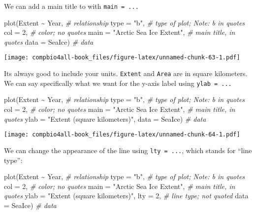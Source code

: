 \documentclass[
]{book}
\newenvironment{Shaded}{\begin{snugshade}}{\end{snugshade}}
\newcommand{\AttributeTok}[1]{\textcolor[rgb]{0.77,0.63,0.00}{#1}}
\newcommand{\CommentTok}[1]{\textcolor[rgb]{0.56,0.35,0.01}{\textit{#1}}}
\newcommand{\DecValTok}[1]{\textcolor[rgb]{0.00,0.00,0.81}{#1}}
\newcommand{\FunctionTok}[1]{\textcolor[rgb]{0.00,0.00,0.00}{#1}}
\newcommand{\NormalTok}[1]{#1}
\newcommand{\SpecialCharTok}[1]{\textcolor[rgb]{0.00,0.00,0.00}{#1}}
\newcommand{\StringTok}[1]{\textcolor[rgb]{0.31,0.60,0.02}{#1}}
\begin{document}
We can add a main title to with \texttt{main\ =\ ...}

\begin{Shaded}
\begin{Highlighting}[]
\FunctionTok{plot}\NormalTok{(Extent }\SpecialCharTok{\textasciitilde{}}\NormalTok{ Year,  }\CommentTok{\# relationship}
     \AttributeTok{type =} \StringTok{"b"}\NormalTok{,     }\CommentTok{\# type of plot; Note: b in quotes}
     \AttributeTok{col =} \DecValTok{2}\NormalTok{,        }\CommentTok{\# color; no quotes}
     \AttributeTok{main =} \StringTok{"Arctic Sea Ice Extent"}\NormalTok{, }\CommentTok{\# main title, in quotes}
     \AttributeTok{data =}\NormalTok{ SeaIce)  }\CommentTok{\# data}
\end{Highlighting}
\end{Shaded}

\texttt{[image: compbio4all-book\_files/figure-latex/unnamed-chunk-63-1.pdf]}

Its always good to include your units. \texttt{Extent} and \texttt{Area} are in square kilometers. We can say specifically what we want for the y-axis label using \texttt{ylab\ =\ ...}

\begin{Shaded}
\begin{Highlighting}[]
\FunctionTok{plot}\NormalTok{(Extent }\SpecialCharTok{\textasciitilde{}}\NormalTok{ Year,  }\CommentTok{\# relationship}
     \AttributeTok{type =} \StringTok{"b"}\NormalTok{,     }\CommentTok{\# type of plot; Note: b in quotes}
     \AttributeTok{col =} \DecValTok{2}\NormalTok{,        }\CommentTok{\# color; no quotes}
     \AttributeTok{main =} \StringTok{"Arctic Sea Ice Extent"}\NormalTok{, }\CommentTok{\# main title, in quotes}
     \AttributeTok{ylab =} \StringTok{"Extent (square kilometers)"}\NormalTok{,}
     \AttributeTok{data =}\NormalTok{ SeaIce)  }\CommentTok{\# data}
\end{Highlighting}
\end{Shaded}

\texttt{[image: compbio4all-book\_files/figure-latex/unnamed-chunk-64-1.pdf]}

We can change the appearance of the line using \texttt{lty\ =\ ...}, which stands for ``line type'':

\begin{Shaded}
\begin{Highlighting}[]
\FunctionTok{plot}\NormalTok{(Extent }\SpecialCharTok{\textasciitilde{}}\NormalTok{ Year,  }\CommentTok{\# relationship}
     \AttributeTok{type =} \StringTok{"b"}\NormalTok{,     }\CommentTok{\# type of plot; Note: b in quotes}
     \AttributeTok{col =} \DecValTok{2}\NormalTok{,        }\CommentTok{\# color; no quotes}
     \AttributeTok{main =} \StringTok{"Arctic Sea Ice Extent"}\NormalTok{, }\CommentTok{\# main title, in quotes}
     \AttributeTok{ylab =} \StringTok{"Extent (square kilometers)"}\NormalTok{,}
     \AttributeTok{lty =} \DecValTok{2}\NormalTok{,        }\CommentTok{\# line type; not quoted}
     \AttributeTok{data =}\NormalTok{ SeaIce)  }\CommentTok{\# data}
\end{Highlighting}
\end{Shaded}
\end{document}
